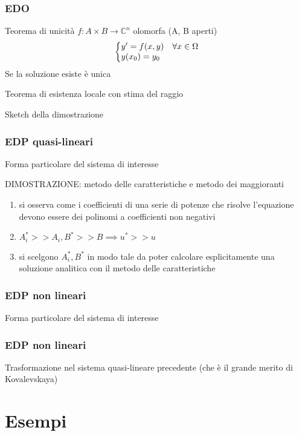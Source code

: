 \documentclass{beamer}
\makeatletter
\newenvironment{system}%
{\left\lbrace\begin{array}{@{}l@{}}}%
{\end{array}\right.}
\makeatother
\begin{document}
\begin{frame}
\frametitle{EDO}
Teorema di unicità $f:A\times B\rightarrow\mathbb{C}^n$ olomorfa (A, B aperti)
\begin{equation}
\begin{system}
y' = f(x,y) \quad \forall x \in \Omega \\
y(x_0)=y_0
\end{system}
\end{equation}
Se la soluzione esiste è unica
\end{frame}

\begin{frame}
Teorema di esistenza locale con stima del raggio
\end{frame}

\begin{frame}
Sketch della dimostrazione
\end{frame}

\begin{frame}
\frametitle{EDP quasi-lineari}
Forma particolare del sistema di interesse
\end{frame}

\begin{frame}
DIMOSTRAZIONE: metodo delle caratteristiche e metodo dei maggioranti
\begin{enumerate}
\item si osserva come i coefficienti di una serie di potenze che risolve l'equazione devono essere dei polinomi a coefficienti non negativi
\item $A_i^*>>A_i, B^*>>B \implies u^*>>u$
\item si scelgono $A_i^*, B^*$ in modo tale da poter calcolare esplicitamente una soluzione analitica con il metodo delle caratteristiche
\end{enumerate}
\end{frame}

\begin{frame}
\frametitle{EDP non lineari}
Forma particolare del sistema di interesse
\end{frame}

\begin{frame}
\frametitle{EDP non lineari}
Trasformazione nel sistema quasi-lineare precedente (che è il grande merito di Kovalevskaya)
\end{frame}




\section{Esempi}
\end{document}
